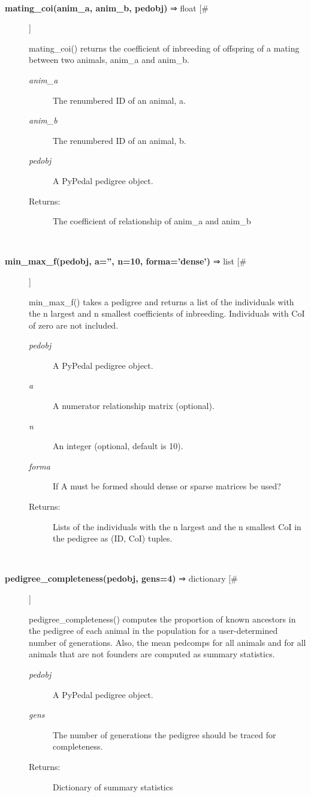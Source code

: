 \begin{description}
\begin{description}
\end{description}
\\ 

\item[\textbf{mating\_coi(anim\_a, anim\_b, pedobj)}
 ⇒ float [\#]]

 mating\_coi() returns the coefficient of inbreeding of offspring of a mating between two animals, anim\_a and anim\_b.
\begin{description}
\item[\emph{anim\_a}
] The renumbered ID of an animal, a.
\item[\emph{anim\_b}
] The renumbered ID of an animal, b.
\item[\emph{pedobj}
] A PyPedal pedigree object.
\item[Returns:] The coefficient of relationship of anim\_a and anim\_b

\end{description}
\\ 

\item[\textbf{min\_max\_f(pedobj, a='', n=10, forma='dense')}
 ⇒ list [\#]]

 min\_max\_f() takes a pedigree and returns a list of the individuals with the n largest and n smallest coefficients of inbreeding. Individuals with CoI of zero are not included.
\begin{description}
\item[\emph{pedobj}
] A PyPedal pedigree object.
\item[\emph{a}
] A numerator relationship matrix (optional).
\item[\emph{n}
] An integer (optional, default is 10).
\item[\emph{forma}
] If A must be formed should dense or sparse matrices be used?
\item[Returns:] Lists of the individuals with the n largest and the n smallest CoI in the pedigree as (ID, CoI) tuples.

\end{description}
\\ 

\item[\textbf{pedigree\_completeness(pedobj, gens=4)}
 ⇒ dictionary [\#]]

 pedigree\_completeness() computes the proportion of known ancestors in the pedigree of each animal in the population for a user-determined number of generations. Also, the mean pedcomps for all animals and for all animals that are not founders are computed as summary statistics.
\begin{description}
\item[\emph{pedobj}
] A PyPedal pedigree object.
\item[\emph{gens}
] The number of generations the pedigree should be traced for completeness.
\item[Returns:] Dictionary of summary statistics


\end{description}
\end{description}

